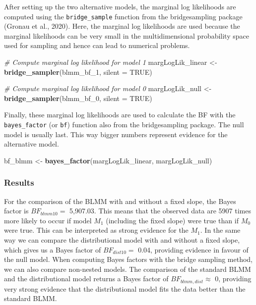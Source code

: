 \documentclass[
  doc,12pt,floatsintext]{apa7}
\newenvironment{Shaded}{\begin{snugshade}}{\end{snugshade}}
\newcommand{\AttributeTok}[1]{\textcolor[rgb]{0.13,0.29,0.53}{#1}}
\newcommand{\CommentTok}[1]{\textcolor[rgb]{0.56,0.35,0.01}{\textit{#1}}}
\newcommand{\ConstantTok}[1]{\textcolor[rgb]{0.56,0.35,0.01}{#1}}
\newcommand{\FunctionTok}[1]{\textcolor[rgb]{0.13,0.29,0.53}{\textbf{#1}}}
\newcommand{\NormalTok}[1]{#1}
\newcommand{\OtherTok}[1]{\textcolor[rgb]{0.56,0.35,0.01}{#1}}
\begin{document}
After setting up the two alternative models, the marginal log likelihoods are computed using the \texttt{bridge\_sample} function from the bridgesampling package (Gronau et al., 2020). Here, the marginal log likelihoods are used because the marginal likelihoods can be very small in the multidimensional probability space used for sampling and hence can lead to numerical problems.

\begin{Shaded}
\begin{Highlighting}[]
\CommentTok{\# Compute marginal log likelihood for model 1}
\NormalTok{margLogLik\_linear }\OtherTok{\textless{}{-}} \FunctionTok{bridge\_sampler}\NormalTok{(blmm\_bf\_1, }\AttributeTok{silent =} \ConstantTok{TRUE}\NormalTok{)}

\CommentTok{\# Compute marginal log likelihood for model 0}
\NormalTok{margLogLik\_null }\OtherTok{\textless{}{-}} \FunctionTok{bridge\_sampler}\NormalTok{(blmm\_bf\_0, }\AttributeTok{silent =} \ConstantTok{TRUE}\NormalTok{)}
\end{Highlighting}
\end{Shaded}

Finally, these marginal log likelihoods are used to calculate the BF with the \texttt{bayes\_factor} (or \texttt{bf}) function also from the bridgesampling package. The null model is usually last. This way bigger numbers represent evidence for the alternative model.

\begin{Shaded}
\begin{Highlighting}[]
\NormalTok{bf\_blmm }\OtherTok{\textless{}{-}} \FunctionTok{bayes\_factor}\NormalTok{(margLogLik\_linear, margLogLik\_null)}
\end{Highlighting}
\end{Shaded}

\subsubsection{Results}\label{results-3}

For the comparison of the BLMM with and without a fixed slope, the Bayes factor is \(BF_{blmm10} =\) 5,907.03. This means that the observed data are 5907 times more likely to occur if model \(M_1\) (including the fixed slope) were true than if \(M_0\) were true. This can be interpreted as strong evidence for the \(M_1\). In the same way we can compare the distributional model with and without a fixed slope, which gives us a Bayes factor of \(BF_{dist10} =\) 0.04, providing evidence in favour of the null model. When computing Bayes factors with the bridge sampling method, we can also compare non-nested models. The comparison of the standard BLMM and the distributional model returns a Bayes factor of \(BF_{blmm,dist} \approx\) 0, providing very strong evidence that the distributional model fits the data better than the standard BLMM.
\end{document}
